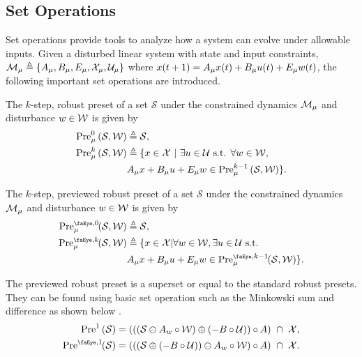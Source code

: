 \subsection{Set Operations}
Set operations provide tools to analyze how a system can evolve under allowable inputs. Given a disturbed linear system with state and input constraints, $\mode{\modeidx}\triangleq\{A_\modeidx, B_\modeidx, E_\modeidx,\xcon[\modeidx],\ucon[\modeidx]\}$ where $x(t+1)=A_{\mu} x(t)+ B_{\mu} u(t)+ E_{\mu} w(t)$, the following important set operations are introduced. 
\begin{definition}
The $k$-step, robust preset of a set $\mathcal{S}$ under the constrained dynamics $\mode{\modeidx}$ and disturbance $w\in\wcon$ is given by
\begin{align}
\Pre[\modeidx][0]{\mathcal{S},\wcon}&\triangleq\mathcal{S},\\
\Pre[\modeidx][k]{\mathcal{S},\wcon}&\triangleq\{x\in\xcon\ |\ \exists u\in\ucon\text{ s.t. }\forall w\in\wcon,\nonumber\\ &A_\modeidx x+ B_\modeidx u+ E_\modeidx w\in\Pre[\modeidx][k-1]{\mathcal{S},\wcon}\}.
\end{align}
\end{definition}
\begin{definition}
The $k$-step, previewed robust preset of a set $\mathcal{S}$ under the constrained dynamics $\mode{\modeidx}$ and disturbance $w\in\wcon$ is given by
\begin{align}
\PreviewedPre[\modeidx][0]{\mathcal{S},\wcon}&\triangleq\mathcal{S},\\
\PreviewedPre[\modeidx][k]{\mathcal{S},\wcon}&\triangleq\{x\in\mathcal{X}|\forall w\in\mathcal{W},\exists u\in\mathcal{U}\text{ s.t. }\nonumber\\
&A_\modeidx x+ B_\modeidx u+ E_\modeidx w\in\PreviewedPre[\modeidx][k-1]{\mathcal{S},\wcon}\}.
\end{align}
\end{definition}
The previewed robust preset is a superset or equal to the standard robust presets.  They can be found using basic set operation such as the Minkowski sum and difference as shown below \cite{Borrelli2017}.
\begin{align}
\Pre[][1]{\mathcal{S}} &= \left(\left(\left(\mathcal{S}\ominus A_w\circ\mathcal{W}\right)\oplus\left(-B\circ\mathcal{U}\right)\right)\circ A\right)\ \cap\ \mathcal{X},\\
\PreviewedPre[][1]{\mathcal{S}} &= \left(\left(\left(\mathcal{S}\oplus\left(-B\circ\mathcal{U}\right)\right)\ominus A_w\circ\mathcal{W}\right)\circ A\right)\ \cap\ \mathcal{X}.
\end{align}

